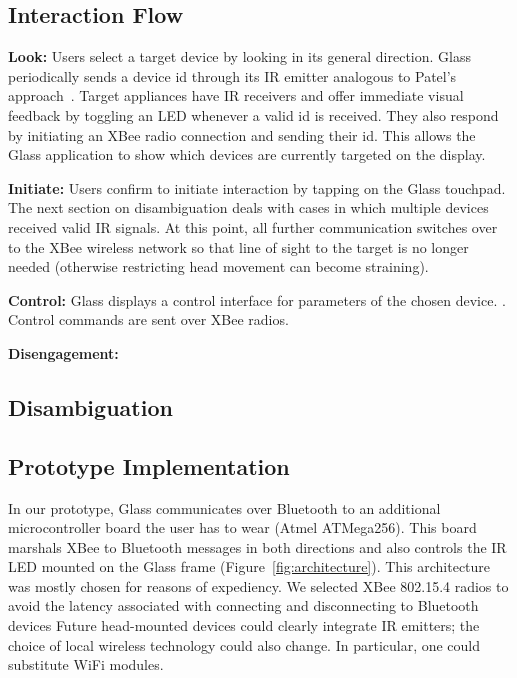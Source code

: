 \subsection{Interaction Flow}
{\bf Look:} Users select a target device by looking in its general direction.
Glass periodically sends a device id through its IR emitter analogous to Patel's approach~\cite{patel_2-way_2003}. Target appliances have IR receivers and offer immediate visual feedback by toggling an LED whenever a valid id is received. They also respond by initiating an XBee radio connection and sending their id. This allows the Glass application to show which devices are currently targeted on the display.

{\bf Initiate:} Users confirm to initiate interaction by tapping on the Glass touchpad. The next section on disambiguation deals with cases in which multiple devices received valid IR signals. At this point, all further communication switches over to the XBee wireless network so that line of sight to the target is no longer needed (otherwise restricting head movement can become straining).

{\bf Control:} Glass displays a control interface for parameters of the chosen device. .
Control commands are sent over XBee radios.

{\bf Disengagement:} 

\subsection{Disambiguation}

\subsection{Prototype Implementation}
In our prototype, Glass communicates over Bluetooth to an additional microcontroller board the user has to wear (Atmel ATMega256). This board marshals XBee to Bluetooth messages in both directions and also controls the IR LED mounted on the Glass frame (Figure~\ref{fig:architecture}). This architecture was mostly chosen for reasons of expediency. We selected XBee 802.15.4 radios to avoid the latency associated with connecting and disconnecting to Bluetooth devices  Future head-mounted devices could clearly integrate IR emitters; the choice of local wireless technology could also change. In particular, one could substitute WiFi modules. 

